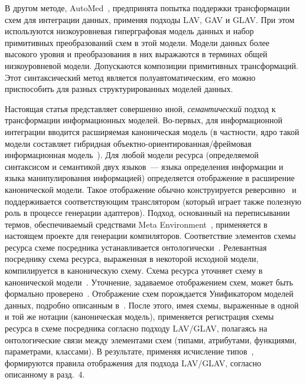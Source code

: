 \begin{multicols}{2}
     В другом методе, AutoMed~\cite{Jas04}, предпринята попытка поддержки
трансформации схем для интеграции данных, применяя подходы LAV, GAV и GLAV. При
этом используются низкоуровневая гиперграфовая модель данных и набор примитивных
преобразований схем в этой модели. Модели данных более высокого уровня и
преобразования в них выражаются в терминах общей низкоуровневой модели.
Допускаются композиции примитивных трансформаций. Этот синтаксический метод
является полуавтоматическим, его можно приспособить для разных структурированных
моделей данных.

     Настоящая статья представляет совершенно иной, \textit{семантический} подход к
трансформации информационных моделей. Во-первых, для информационной интеграции
вводится расширяемая каноническая модель (в частности, ядро такой модели составляет
гибридная объект\-но-ориентированная/фреймовая информационная
модель~\cite{KlaStu07}). Для любой модели ресурса (определяемой синтаксисом и
семантикой двух языков~--- языка определения информации и языка манипулирования
информацией) определяется отображение в расширение канонической модели. Такое
отображение обычно конструируется реверсивно~\cite{Kla02, Kla04} и поддерживается
соответствующим транслятором (который играет также полезную роль в процессе
генерации адаптеров). Подход, основанный на переписывании термов, обеспечиваемый
средствами Meta Environment~\cite{Bran02}, применяется в настоящем проекте для
генерации компиляторов. Соответствие элементов схемы ресурса схеме посредника
устанавливается онтологически~\cite{Briu98, Briu01}. Релевантная посреднику схема
ресурса, выраженная в некоторой исходной модели, компилируется в каноническую
схему. Схема ресурса уточняет схему в канонической модели~\cite{Kla04}. Уточнение,
задаваемое отображением схем, может быть формально проверено~\cite{Сту05}.
Отображение схем порождается Унификатором моделей данных, подробно описанным
в~\cite{Зах07}. После этого, имея схемы, выраженные в одной и той же нотации
(каноническая модель), применяется регистрация схемы ресурса в схеме посредника
согласно подходу LAV/GLAV, полагаясь на онтологические связи между элементами
схем (типами, атрибутами, функциями, параметрами, классами). В результате, применяя
исчисление типов~\cite{Kla99}, формируются правила отображения для подхода
LAV/GLAV, согласно описанному в разд.~4.

\medskip


\end{multicols}
